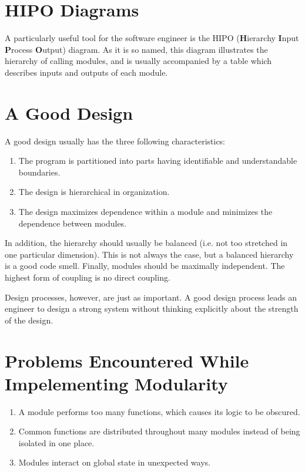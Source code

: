 \documentclass[format.tex]{subfiles}
\begin{document}
\section{HIPO Diagrams}
A particularly useful tool for the software engineer is the HIPO
({\bf H}ierarchy {\bf I}nput {\bf P}rocess {\bf O}utput) diagram. As it is so
named, this diagram illustrates the hierarchy of calling modules, and is
usually accompanied by a table which describes inputs and outputs of each
module.

\section{A Good Design}
A good design usually has the three following characteristics:
\begin{enumerate}
\item The program is partitioned into parts having identifiable and
  understandable boundaries.
\item The design is hierarchical in organization.
\item The design maximizes dependence within a module and minimizes the
  dependence between modules.
\end{enumerate}

In addition, the hierarchy should usually be balanced (i.e. not too stretched
in one particular dimension). This is not always the case, but a balanced
hierarchy is a good code smell. Finally, modules should be maximally
independent. The highest form of coupling is no direct coupling.

Design processes, however, are just as important. A good design process leads
an engineer to design a strong system without thinking explicitly about the
strength of the design.

\section{Problems Encountered While Impelementing Modularity}
\begin{enumerate}
\item A module performs too many functions, which causes its logic to be
  obscured.
\item Common functions are distributed throughout many modules instead of being
  isolated in one place.
\item Modules interact on global state in unexpected ways.
\end{enumerate}
\end{document}

